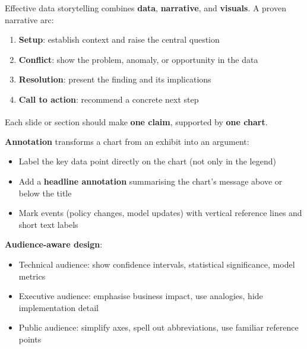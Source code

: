 \begin{tcbitemize}[ skin=sectionraster ]
    \tcbitem[title={Narrative Structure in Data Presentations}, raster multicolumn=3]
    Effective data storytelling combines \textbf{data}, \textbf{narrative}, and
    \textbf{visuals}. A proven narrative arc:
    \begin{enumerate}
        \item \textbf{Setup}: establish context and raise the central question
        \item \textbf{Conflict}: show the problem, anomaly, or opportunity in the data
        \item \textbf{Resolution}: present the finding and its implications
        \item \textbf{Call to action}: recommend a concrete next step
    \end{enumerate}
    Each slide or section should make \textbf{one claim}, supported by \textbf{one
    chart}\textsuperscript{\cite[][pp.~25--60]{loducaDataStorytellingAltair2024}}.

    \tcbitem[title={Annotation, Context, and Audience Design}, raster multicolumn=3]
    \textbf{Annotation} transforms a chart from an exhibit into an argument:
    \begin{itemize}
        \item Label the key data point directly on the chart (not only in the legend)
        \item Add a \textbf{headline annotation} summarising the chart's message above
              or below the title
        \item Mark events (policy changes, model updates) with vertical reference lines
              and short text labels
    \end{itemize}
    \textbf{Audience-aware design}:
    \begin{itemize}
        \item Technical audience: show confidence intervals, statistical significance,
              model metrics
        \item Executive audience: emphasise business impact, use analogies, hide
              implementation detail
        \item Public audience: simplify axes, spell out abbreviations, use familiar
              reference points
    \end{itemize}
\end{tcbitemize}


